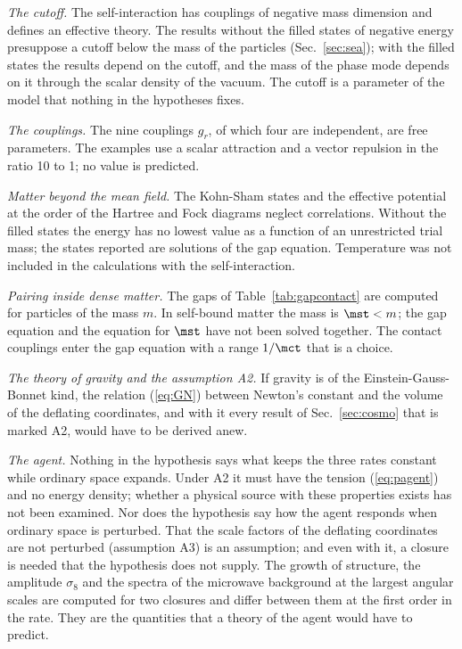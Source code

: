 \emph{The cutoff.} The self-interaction has couplings of negative mass dimension and defines an
effective theory. The results without the filled states of negative energy presuppose a cutoff below
the mass of the particles (Sec.~\ref{sec:sea}); with the filled states the results depend on the
cutoff, and the mass of the phase mode depends on it through the scalar density of the vacuum. The
cutoff is a parameter of the model that nothing in the hypotheses fixes.

\emph{The couplings.} The nine couplings $g_r$, of which four are independent, are free parameters.
The examples use a scalar attraction and a vector repulsion in the ratio 10 to 1; no value is
predicted.

\emph{Matter beyond the mean field.} The Kohn-Sham states and the effective potential at the order
of the Hartree and Fock diagrams neglect correlations. Without the filled states the energy has no
lowest value as a function of an unrestricted trial mass; the states reported are solutions of the
gap equation. Temperature was not included in the calculations with the self-interaction.

\emph{Pairing inside dense matter.} The gaps of Table~\ref{tab:gapcontact} are computed for
particles of the mass $m$. In self-bound matter the mass is $\mst<m$; the gap equation and the
equation for $\mst$ have not been solved together. The contact couplings enter the gap equation with
a range $1/\mct$ that is a choice.

\emph{The theory of gravity and the assumption A2.} If gravity is of the Einstein-Gauss-Bonnet kind,
the relation (\ref{eq:GN}) between Newton's constant and the volume of the deflating coordinates,
and with it every result of Sec.~\ref{sec:cosmo} that is marked A2, would have to be derived anew.

\emph{The agent.} Nothing in the hypothesis says what keeps the three rates constant while ordinary
space expands. Under A2 it must have the tension (\ref{eq:pagent}) and no energy density; whether a
physical source with these properties exists has not been examined. Nor does the hypothesis say how
the agent responds when ordinary space is perturbed. That the scale factors of the deflating
coordinates are not perturbed (assumption A3) is an assumption; and even with it, a closure is
needed that the hypothesis does not supply. The growth of structure, the amplitude $\sigma_8$ and
the spectra of the microwave background at the largest angular scales are computed for two closures
and differ between them at the first order in the rate. They are the quantities that a theory of
the agent would have to predict.

